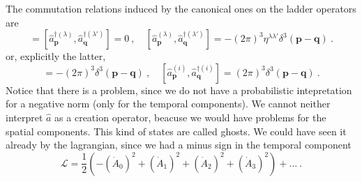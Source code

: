     The commutation relations induced by the canonical ones on the ladder operators are 
    \begin{equation*}
        [\hat a_{\mathbf p}^{(\lambda)}, \hat a_{\mathbf q}^{(\lambda')}] = [\hat a_{\mathbf p}^{\dagger (\lambda)}, \hat a_{\mathbf q}^{\dagger (\lambda')}] = 0 ~, \quad [\hat a_{\mathbf p}^{(\lambda)}, \hat a_{\mathbf q}^{\dagger(\lambda')}] = - (2\pi)^3 \eta^{\lambda \lambda'} \delta^3 (\mathbf p - \mathbf q) ~.
    \end{equation*}
    or, explicitly the latter, 
    \begin{equation*}
        [\hat a_{\mathbf p}^{(0)}, \hat a_{\mathbf q}^{\dagger (0)}] = - (2\pi)^3 \delta^3 (\mathbf p - \mathbf q) ~, \quad [\hat a_{\mathbf p}^{(i)}, \hat a_{\mathbf q}^{\dagger (i)}] = (2\pi)^3 \delta^3 (\mathbf p - \mathbf q) ~.
    \end{equation*}
    Notice that there is a problem, since we do not have a probabilistic intepretation for a negative norm (only for the temporal components). We cannot neither interpret $\hat a$ as a creation operator, beacuse we would have problems for the spatial components. This kind of states are called ghosts. We could have seen it already by the lagrangian, since we had a minus sign in the temporal component
    \begin{equation*}
        \mathcal L = \frac{1}{2} (- (\dot A_0)^2 + (\dot A_1)^2 + (\dot A_2)^2 +(\dot A_3)^2 ) + \ldots ~.
    \end{equation*}
